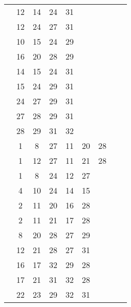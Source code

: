 \begin{table}[H]
\begin{tabular}{|c|cccccccc|}
 & 12 & 14 & 24 & 31 &   &   &   &  \\
 & 12 & 24 & 27 & 31 &   &   &   &  \\
 & 10 & 15 & 24 & 29 &   &   &   &  \\
 & 16 & 20 & 28 & 29 &   &   &   &  \\
 & 14 & 15 & 24 & 31 &   &   &   &  \\
 & 15 & 24 & 29 & 31 &   &   &   &  \\
 & 24 & 27 & 29 & 31 &   &   &   &  \\
 & 27 & 28 & 29 & 31 &   &   &   &  \\
 & 28 & 29 & 31 & 32 &   &   &   &  \\
 & 1 & 8 & 27 & 11 & 20 & 28 &   &  \\
 & 1 & 12 & 27 & 11 & 21 & 28 &   &  \\
 & 1 & 8 & 24 & 12 & 27 &   &   &  \\
 & 4 & 10 & 24 & 14 & 15 &   &   &  \\
 & 2 & 11 & 20 & 16 & 28 &   &   &  \\
 & 2 & 11 & 21 & 17 & 28 &   &   &  \\
 & 8 & 20 & 28 & 27 & 29 &   &   &  \\
 & 12 & 21 & 28 & 27 & 31 &   &   &  \\
 & 16 & 17 & 32 & 29 & 28 &   &   &  \\
 & 17 & 21 & 31 & 32 & 28 &   &   &  \\
 & 22 & 23 & 29 & 32 & 31 &   &   &  \\
\end{tabular}
\end{table}
